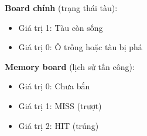 \textbf{Board chính} (trạng thái tàu):
\begin{itemize}
    \item Giá trị 1: Tàu còn sống
    \item Giá trị 0: Ô trống hoặc tàu bị phá
\end{itemize}

\textbf{Memory board} (lịch sử tấn công):
\begin{itemize}
    \item Giá trị 0: Chưa bắn
    \item Giá trị 1: MISS (trượt)
    \item Giá trị 2: HIT (trúng)
\end{itemize}

